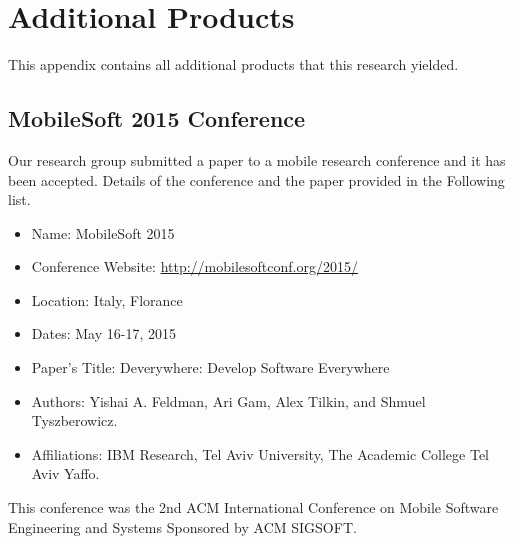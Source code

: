 \chapter{Additional Products}
This appendix contains all additional products that this research yielded.

\section{MobileSoft 2015 Conference}
Our research group submitted a paper to a mobile research conference and it has been accepted. Details of the conference and the paper provided in the Following list.
\begin{itemize}
	\item Name: MobileSoft 2015
	\item Conference Website: \url{http://mobilesoftconf.org/2015/}
	\item Location: Italy, Florance
	\item Dates: May 16-17, 2015
	\item Paper's Title: Deverywhere: Develop Software Everywhere
	\item Authors: Yishai A. Feldman, Ari Gam, Alex Tilkin, and Shmuel Tyszberowicz.
	\item Affiliations: IBM Research, Tel Aviv University, The Academic College Tel Aviv Yaffo.
\end{itemize}
This conference was the 2nd ACM International Conference on Mobile Software Engineering and Systems Sponsored by ACM SIGSOFT.

